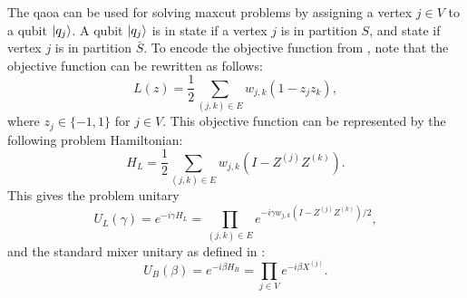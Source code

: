 The \gls{qaoa} can be used for solving \gls{maxcut} problems by assigning a vertex $j \in V$ to a qubit $\vert{q_j}\rangle$.
A qubit $\vert{q_j}\rangle$ is in state  if a vertex $j$ is in partition $S$, and state  if vertex $j$ is in partition $\bar{S}$.
To encode the objective function from , note that the objective function can be rewritten as follows:
\begin{equation}
L(z) = \frac{1}{2} \sum_{(j, k) \in E} w_{j, k}(1 - z_jz_k),
\end{equation}
where $z_j \in \{-1, 1\}$ for $j \in V$.
This objective function can be represented by the following problem Hamiltonian:
\begin{equation} \label{eqn:problem-hamiltonian}
H_L = \frac{1}{2} \sum_{(j, k) \in E} w_{j, k}\left(I - Z^{(j)}Z^{(k)}\right).
\end{equation}
This gives the problem unitary
\begin{equation} \label{eqn:problem-unitary}
U_L(\gamma) = e^{-i\gamma H_L} = \prod_{(j, k) \in E} e^{-i\gamma w_{j, k}(I - Z^{(j)}Z^{(k)})/2},
\end{equation}
and the standard mixer unitary as defined in :
\begin{equation} \label{eqn:mixer-unitary}
U_B(\beta) = e^{-i\beta H_B} = \prod_{j \in V} e^{-i\beta X^{(j)}}.
\end{equation}

